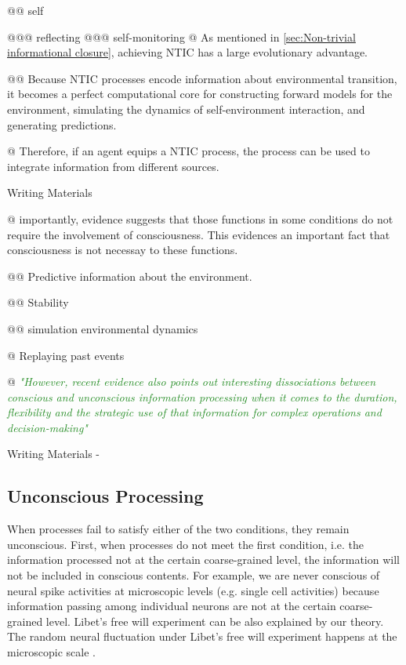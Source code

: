\documentclass[utf8]{article}
\newenvironment{ants}
			{
			 \begin{easylist}[itemize]
		 	}
			{
			\end{easylist}
			} %
\newenvironment{WritingMaterials} %
    	{
            \begin{tcolorbox}[enhanced,
                title=-,
                size=small,
                colbacktitle=Aquamarine,
                drop fuzzy shadow,
                fontupper=\small,
                boxrule=0.4pt,
                colback=Aquamarine!10!white,
                sharp corners]
                Writing Materials
            \end{tcolorbox}
            \begin{easylist}[itemize]
    	}
    	{
            \end{easylist}  
            \begin{tcolorbox}[enhanced,
                halign=flush right,
                halign title=right,
                size=small,
                colbacktitle=Aquamarine,
                drop fuzzy shadow,
                fontupper=\small,
                boxrule=0.4pt,
                colback=Aquamarine,
                colupper=White,
                sharp corners]
                Writing Materials -
            \end{tcolorbox}        
    	}
\newcommand{\rewrite}[1]{\textcolor{ForestGreen}{\textit{"#1"}}\newline}
\begin{document}
\begin{ants}
    		    @@ self
    		    
    		        @@@ reflecting
    		        @@@ self-monitoring 
            @ As mentioned in \ref{sec:Non-trivial informational closure}, achieving NTIC has a large evolutionary advantage. 
            
                @@ Because NTIC processes encode information about environmental transition, it becomes a perfect computational core for constructing forward models for the environment, simulating the dynamics of self-environment interaction, and generating predictions. 
                
            @ Therefore, if an agent equips a NTIC process, the process can be used to integrate information from different sources. 
                
                
		\end{ants}
		

	
		 
	    \begin{WritingMaterials}
	        @ importantly, evidence suggests that those functions in some conditions do not require the involvement of consciousness. This evidences an important fact that consciousness is not necessay to these functions. 
	        
	        
	        @@ Predictive information about the environment.
	        
	        @@ Stability 
	        
	        @@ simulation environmental dynamics 
	        
	        @ Replaying past events
	        
	        @ \rewrite{However, recent evidence also points out interesting dissociations between conscious and unconscious information processing when it comes to the duration, flexibility and the strategic use of that information for complex operations and decision-making} \cite{van2012role}
	        
	    \end{WritingMaterials}
	    
	    
		
		\subsection{Unconscious Processing}
		When processes fail to satisfy either of the two conditions, they remain unconscious. First, when processes do not meet the first condition, i.e. the information processed not at the certain coarse-grained level, the information will not be included in conscious contents. For example, we are never conscious of neural spike activities at microscopic levels (e.g. single cell activities) because information passing among individual neurons are not at the certain coarse-grained level. Libet's free will experiment can be also explained by our theory. The random neural fluctuation under Libet's free will experiment happens at the microscopic scale \citep{SchurgerE2904}. 
		
\end{document}
